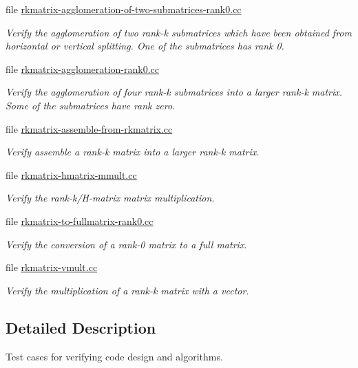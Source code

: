 \begin{DoxyCompactItemize}
file \hyperlink{rkmatrix-agglomeration-of-two-submatrices-rank0_8cc}{rkmatrix-\/agglomeration-\/of-\/two-\/submatrices-\/rank0.\+cc}
\begin{DoxyCompactList}\small\item\em Verify the agglomeration of two rank-\/k submatrices which have been obtained from horizontal or vertical splitting. One of the submatrices has rank 0. \end{DoxyCompactList}\item 
file \hyperlink{rkmatrix-agglomeration-rank0_8cc}{rkmatrix-\/agglomeration-\/rank0.\+cc}
\begin{DoxyCompactList}\small\item\em Verify the agglomeration of four rank-\/k submatrices into a larger rank-\/k matrix. Some of the submatrices have rank zero. \end{DoxyCompactList}\item 
file \hyperlink{rkmatrix-assemble-from-rkmatrix_8cc}{rkmatrix-\/assemble-\/from-\/rkmatrix.\+cc}
\begin{DoxyCompactList}\small\item\em Verify assemble a rank-\/k matrix into a larger rank-\/k matrix. \end{DoxyCompactList}\item 
file \hyperlink{rkmatrix-hmatrix-mmult_8cc}{rkmatrix-\/hmatrix-\/mmult.\+cc}
\begin{DoxyCompactList}\small\item\em Verify the rank-\/k/\+H-\/matrix matrix multiplication. \end{DoxyCompactList}\item 
file \hyperlink{rkmatrix-to-fullmatrix-rank0_8cc}{rkmatrix-\/to-\/fullmatrix-\/rank0.\+cc}
\begin{DoxyCompactList}\small\item\em Verify the conversion of a rank-\/0 matrix to a full matrix. \end{DoxyCompactList}\item 
file \hyperlink{rkmatrix-vmult_8cc}{rkmatrix-\/vmult.\+cc}
\begin{DoxyCompactList}\small\item\em Verify the multiplication of a rank-\/k matrix with a vector. \end{DoxyCompactList}\end{DoxyCompactItemize}


\subsection{Detailed Description}
Test cases for verifying code design and algorithms. 

